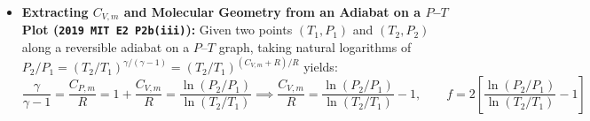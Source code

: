 \begin{formulacard}
\begin{itemize}
  \item \textbf{Extracting $C_{V,m}$ and Molecular Geometry from an Adiabat on a $P$--$T$ Plot (\texttt{2019 MIT E2 P2b(iii)}):}
  Given two points $(T_1, P_1)$ and $(T_2, P_2)$ along a reversible adiabat on a $P$--$T$ graph, taking natural logarithms of $P_2/P_1 = (T_2/T_1)^{\gamma/(\gamma-1)} = (T_2/T_1)^{(C_{V,m}+R)/R}$ yields:
  \begin{equation}\label{eq:07:pt-adiabat-cv}
    \frac{\gamma}{\gamma - 1} = \frac{C_{P,m}}{R} = 1 + \frac{C_{V,m}}{R} = \frac{\ln(P_2/P_1)}{\ln(T_2/T_1)} \implies \boxed{\frac{C_{V,m}}{R} = \frac{\ln(P_2/P_1)}{\ln(T_2/T_1)} - 1, \qquad f = 2\left[\frac{\ln(P_2/P_1)}{\ln(T_2/T_1)} - 1\right]}
  \end{equation}
\end{itemize}
\end{formulacard}

